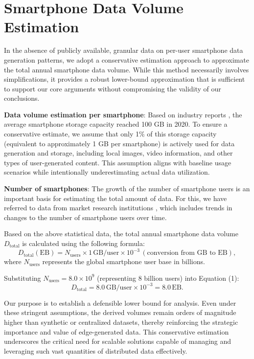 \section{Smartphone Data Volume Estimation}  
\label{app:smartphone_ethod}

In the absence of publicly available, granular data on per-user smartphone data generation patterns, we adopt a conservative estimation approach to approximate the total annual smartphone data volume. While this method necessarily involves simplifications, it provides a robust lower-bound approximation that is sufficient to support our core arguments without compromising the validity of our conclusions.

\textbf{Data volume estimation per smartphone}: Based on industry reports  \cite{counterpoint_smartphone_2021}, the average smartphone storage capacity reached 100 GB in 2020. To ensure a conservative estimate, we assume that only 1\% of this storage capacity (equivalent to approximately 1 GB per smartphone) is actively used for data generation and storage, including local images, video information, and other types of user-generated content. This assumption aligns with baseline usage scenarios while intentionally underestimating actual data utilization.


\textbf{Number of smartphones}: The growth of the number of smartphone users is an important basis for estimating the total amount of data. For this, we have referred to data from market research institutions \cite{bankmycell_smartphone_2023}, which includes trends in changes to the number of smartphone users over time.


Based on the above statistical data, the total annual smartphone data volume \( D_{\text{total}} \) is calculated using the following formula:  
\begin{equation}  
    D_{\text{total}}  (\text{EB}) = N_{\text{users}} \times 1 \, \text{GB/user} \times 10^{-3}  \, (\text{conversion from GB to EB}),
\end{equation}  
where \( N_{\text{users}} \) represents the global smartphone user base in billions.  

Substituting \( N_{\text{users}} = 8.0 \times 10^9 \) (representing 8 billion users) into Equation (1):  
\begin{equation*}  
    D_{\text{total}} = 8.0 \, \text{GB/user} \times 10^{-3} = 8.0 \, \text{EB}.
\end{equation*}  

Our purpose is to establish a defensible lower bound for analysis. Even under these stringent assumptions, the derived volumes remain orders of magnitude higher than synthetic or centralized datasets, thereby reinforcing the strategic importance and value of edge-generated data. This conservative estimation underscores the critical need for scalable solutions capable of managing and leveraging such vast quantities of distributed data effectively.  


